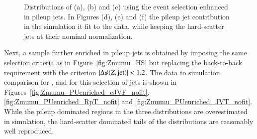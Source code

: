 \documentclass{atlasnote}
\begin{document}
\begin{figure}[!htbp]
{    \label{fig:Zmumu_PUenriched_cJVF}
  }
  \caption{Distributions of \cJVF (a), \RpT (b) and \JVT (c) using the event selection enhanced in pileup jets.  
      In Figures (d), (e) and 
      (f) the pileup jet contribution in the simulation it fit to the data, while keeping the hard-scatter jets at their nominal
      normalization. 
  }
  \label{fig:Zmumu_PUenriched}
\end{figure}
Next, a sample further enriched in pileup jets 
is obtained by imposing the same selection criteria as in Figure~\ref{fig:Zmumu_HS} but replacing the back-to-back requirement with 
the criterion $|\Delta \phi(Z,{\rm jet})|<1.2$. 
The data to simulation comparison for \cJVF, \RpT and \JVT for this selection of jets 
is shown in Figures~\ref{fig:Zmumu_PUenriched_cJVF_nofit},\ref{fig:Zmumu_PUenriched_RpT_nofit} and \ref{fig:Zmumu_PUenriched_JVT_nofit}.
While the pileup dominated regions in the three distributions are overestimated in simulation, 
the hard-scatter dominated tails of the distributions are reasonably well reproduced. 
\end{document}
